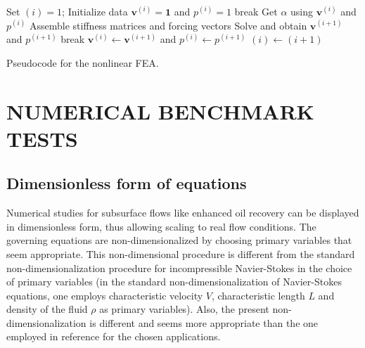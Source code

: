 \documentclass[11pt,reqno]{amsart}
\begin{document}
\begin{algorithm}[h]
  \begin{algorithmic}
    \State Set $(i) = 1$;
    \State Initialize data $\mathbf{v}^{(i)} = \mathbf{1}$ and $p^{(i)} = 1$
     
	    	\State break
	    \EndIf
	    \State Get $\alpha$ using $\mathbf{v}^{(i)}$ and $p^{(i)}$
	    \State Assemble stiffness matrices and forcing vectors
	    \State Solve and obtain $\mathbf{v}^{(i+1)}$ and $p^{(i+1)}$
	    	\State break
	    \Else
	    	\State $\mathbf{v}^{(i)} \leftarrow \mathbf{v}^{(i+1)}$  and $p^{(i)} \leftarrow p^{(i+1)}$
	    	\State $(i) \leftarrow (i+1)$ 
	    \EndIf
    \EndWhile
  \end{algorithmic}
  \caption{Pseudocode for the nonlinear FEA. \label{Algo:MDF_Pseudocode}}
\end{algorithm}
 
\section{NUMERICAL BENCHMARK TESTS}
\label{Ch:benchmark}

\subsection{Dimensionless form of equations}
Numerical studies for subsurface flows like enhanced 
oil recovery can be displayed in dimensionless form, 
thus allowing scaling to real flow conditions. The 
governing equations are non-dimensionalized by 
choosing primary variables that seem appropriate. 
This non-dimensional procedure is different from 
the standard non-dimensionalization procedure for 
incompressible Navier-Stokes in the choice of primary 
variables (in the standard non-dimensionalization of 
Navier-Stokes equations, one employs characteristic 
velocity $V$, characteristic length $L$ and density 
of the fluid $\rho$ as primary variables). Also, the 
present non-dimensionalization is different and seems 
more appropriate than the one employed in reference 
\cite{Nakshatrala_Rajagopal_IJNMF_2011_v67_p342} for 
the chosen applications. 
\end{document}
